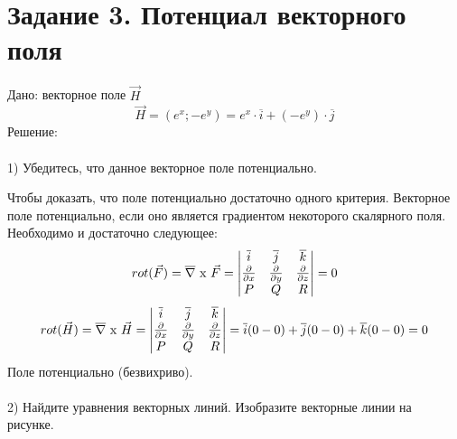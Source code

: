 \documentclass{article}
\begin{document}
\section*{Задание 3. Потенциал векторного поля}
Дано: векторное поле $\vec{H}$
\begin{equation*}
    \vec{H} = (e^x;-e^{y}) = e^x\cdot \overline{i}+(-e^y)\cdot\overline{j}
\end{equation*}
Решение:
\\ \\
1) Убедитесь, что данное векторное поле потенциально.

Чтобы доказать, что поле потенциально достаточно одного критерия. Векторное поле потенциально, если оно является градиентом некоторого скалярного поля. 
Необходимо и достаточно следующее:
\begin{equation*}
    rot(\vec{F}) = \overline{\nabla}\text{ x }\vec{F} = 
    \begin{vmatrix}
        \overline{i}&\overline{j}&\overline{k}\\
        \pdv{}{x}&\pdv{}{y}&\pdv{}{z}\\
        P&Q&R\\
    \end{vmatrix}
    = 0
\end{equation*}
\begin{equation*}
    rot(\vec{H}) = \overline{\nabla}\text{ x }\vec{H} = 
    \begin{vmatrix}
        \overline{i}&\overline{j}&\overline{k}\\
        \pdv{}{x}&\pdv{}{y}&\pdv{}{z}\\
        P&Q&R\\
    \end{vmatrix}
    = \overline{i}(0-0) + \overline{j}(0-0) + \overline{k}(0-0)
    = 0
\end{equation*}
Поле потенциально (безвихриво).
\\
\\
2) Найдите уравнения векторных линий. Изобразите векторные линии на рисунке.
\end{document}
